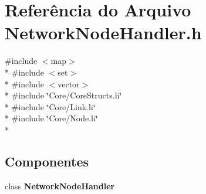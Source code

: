 \section{Referência do Arquivo Network\+Node\+Handler.\+h}
\label{_network_node_handler_8h}
{\ttfamily \#include $<$map$>$}\\*
{\ttfamily \#include $<$set$>$}\\*
{\ttfamily \#include $<$vector$>$}\\*
{\ttfamily \#include \char`\"{}Core/\+Core\+Structs.\+h\char`\"{}}\\*
{\ttfamily \#include \char`\"{}Core/\+Link.\+h\char`\"{}}\\*
{\ttfamily \#include \char`\"{}Core/\+Node.\+h\char`\"{}}\\*
\subsection*{Componentes}
\begin{DoxyCompactItemize}
\item 
class {\bf Network\+Node\+Handler}
\end{DoxyCompactItemize}
